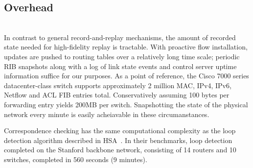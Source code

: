 \subsection{Overhead}

  \\

 In contrast to general record-and-replay
mechanisms, the amount of recorded state needed for
high-fidelity replay is tractable. With proactive flow installation, 
updates are pushed to routing tables over a relatively long time scale; periodic
RIB snapshots along with a log of link state events and control server uptime information 
suffice for our purposes. As a point of reference, the Cisco 7000 series datacenter-class
switch supports approximately 2 million MAC, IPv4, IPv6, Netflow and ACL
FIB entries total. Conservatively assuming 100 bytes per forwarding entry
yields 200MB per switch. Snapshotting the state of the physical network every
minute is easily acheiavable in these circumanstances.

 Correspondence checking has
the same computational complexity as the loop detection algorithm described in
HSA~\cite{hsa}. In their benchmarks, loop detection completed on the Stanford
backbone network, consisting of 14 routers and 10 switches, completed in 560 seconds
(9 minutes).

